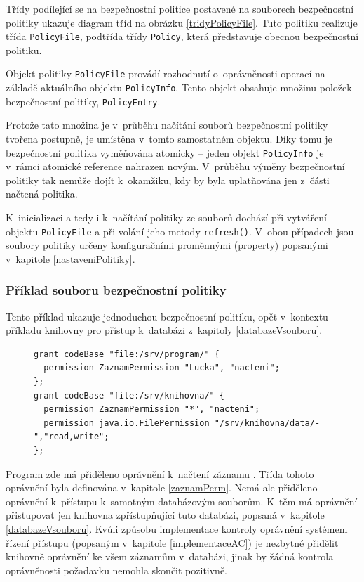 Třídy podílející se na bezpečnostní politice postavené na souborech bezpečnostní politiky ukazuje diagram tříd na obrázku \ref{tridyPolicyFile}.
Tuto politiku realizuje třída {\tt PolicyFile}, podtřída třídy {\tt Policy}, která představuje obecnou bezpečnostní politiku.

Objekt politiky {\tt PolicyFile} provádí rozhodnutí o~oprávněnosti operací na základě aktuálního objektu {\tt PolicyInfo}.
Tento objekt obsahuje množinu položek bezpečnostní politiky, {\tt PolicyEntry}.

Protože tato množina je v~průběhu načítání souborů bezpečnostní politiky tvořena postupně, je umístěna v~tomto samostatném objektu.
Díky tomu je bezpečnostní politika vyměňována atomicky -- jeden objekt {\tt PolicyInfo} je v~rámci atomické reference nahrazen novým.
V~průběhu výměny bezpečnostní politiky tak nemůže dojít k~okamžiku, kdy by byla uplatňována jen z~části načtená politika.

K~inicializaci a tedy i k~načítání politiky ze souborů dochází při vytváření objektu {\tt PolicyFile} a při volání jeho metody {\tt refresh()}.
V~obou případech jsou soubory politiky určeny konfiguračními proměnnými (property) popsanými v~kapitole \ref{nastaveniPolitiky}.

\subsubsection{Příklad souboru bezpečnostní politiky}

Tento příklad ukazuje jednoduchou bezpečnostní politiku, opět v~kontextu příkladu knihovny pro přístup k~databázi z~kapitoly \ref{databazeVsouboru}.

\begin{figure}[tbh]
\begin{lstlisting}[caption=Příklad souboru bezpečnostní politiky, label=prikladSouboruBP]
grant codeBase "file:/srv/program/" {
  permission ZaznamPermission "Lucka", "nacteni";
};
grant codeBase "file:/srv/knihovna/" {
  permission ZaznamPermission "*", "nacteni";
  permission java.io.FilePermission "/srv/knihovna/data/-","read,write";
};
\end{lstlisting}
\end{figure}

Program zde má přiděleno oprávnění k~načtení záznamu . Třída tohoto oprávnění byla definována v~kapitole \ref{zaznamPerm}.
Nemá ale přiděleno oprávnění k~přístupu k~samotným databázovým souborům.
K~těm má oprávnění přistupovat jen knihovna zpřístupňující tuto databázi, popsaná v~kapitole \ref{databazeVsouboru}.
Kvůli způsobu implementace kontroly oprávnění systémem řízení přístupu (popsaným v~kapitole \ref{implementaceAC}) je nezbytné přidělit knihovně oprávnění ke všem záznamům v~databázi, jinak by žádná kontrola oprávněnosti požadavku nemohla skončit pozitivně.

